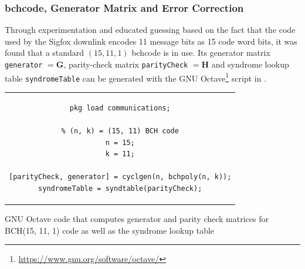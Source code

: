 \subsubsection{\gls{bchcode}, Generator Matrix and Error Correction}
Through experimentation and educated guessing based on the fact that the code used by the Sigfox downlink encodes 11 message bits as 15 code word bits, it was found that a standard $(15, 11, 1)$ \gls{bchcode} is in use.
Its generator matrix \texttt{generator} $= \mathbf G$, parity-check matrix \texttt{parityCheck} $= \mathbf H$ and syndrome lookup table \texttt{syndromeTable} can be generated with the GNU Octave\footnote{\url{https://www.gnu.org/software/octave/}} script in .


\begin{lstfloat}[h]
\centering
\begin{tabular}{c}
\begin{lstlisting}
pkg load communications;

% (n, k) = (15, 11) BCH code
n = 15;
k = 11;

[parityCheck, generator] = cyclgen(n, bchpoly(n, k));
syndromeTable = syndtable(parityCheck);
\end{lstlisting}
\end{tabular}
\caption{GNU Octave code that computes generator and parity check matrices for BCH(15, 11, 1) code as well as the syndrome lookup table}
\label{lst:downlink_bch_listing}
\end{lstfloat}

